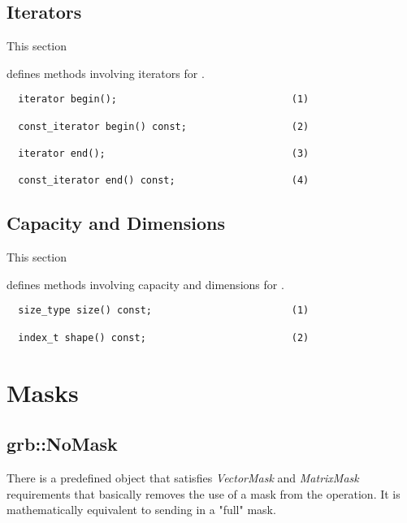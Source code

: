 \subsection{Iterators}
\hypertarget{iterators}{This section} defines methods involving iterators for .

\begin{verbatim}
  iterator begin();                              (1)

  const_iterator begin() const;                  (2)

  iterator end();                                (3)

  const_iterator end() const;                    (4)
\end{verbatim}


\subsection{Capacity and Dimensions}
\hypertarget{capacity}{This section} defines methods involving capacity and dimensions for .

\begin{verbatim}
  size_type size() const;                        (1)

  index_t shape() const;                         (2)
\end{verbatim}


\section{Masks}
\label{Sec:Masks}



\subsection{\sf grb::NoMask}

There is a predefined object that satisfies \textit{VectorMask} and \textit{MatrixMask}
requirements that basically removes the use of a mask from the operation. It
is mathematically equivalent to sending in a "full" mask.

